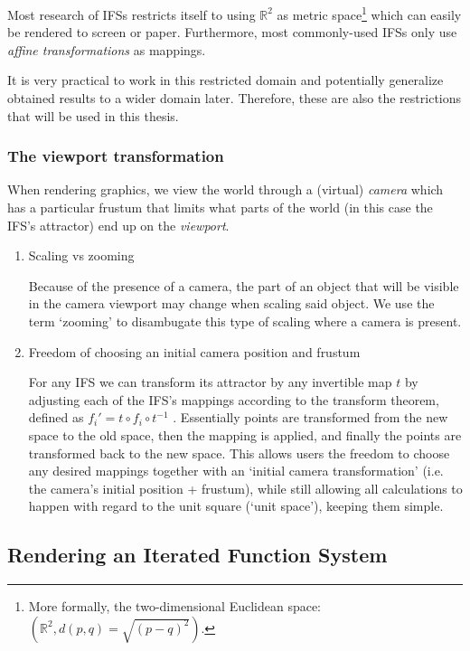 \documentclass[11pt]{article}
\begin{document}
Most research of IFSs restricts itself to using \(\mathbb{R}^2\) as metric space\footnote{More formally, the two-dimensional Euclidean space: \(\left(\mathbb{R}^2, d(p, q) = \sqrt{(p - q)^2}\right)\).} which can easily be rendered to screen or paper.
Furthermore, most commonly-used IFSs only use \emph{affine transformations} as mappings.

It is very practical to work in this restricted domain 
and potentially generalize obtained results to a wider domain later.
Therefore, these are also the restrictions that will be used in this thesis.

\subsubsection{The viewport transformation}
\label{sec:org93776c4}
\label{subsection:viewport_transformation}

When rendering graphics, we view the world through a (virtual) \emph{camera} which has a particular frustum 
that limits what parts of the world (in this case the IFS's attractor) end up on the \emph{viewport}.

\begin{enumerate}
\item Scaling vs zooming
\label{sec:org70804c5}

Because of the presence of a camera, the part of an object that will be visible in the camera viewport may change when scaling said object.
We use the term `zooming' to disambugate this type of scaling where a camera is present.

\item Freedom of choosing an initial camera position and frustum
\label{sec:org816d2a2}

For any IFS we can transform its attractor by any invertible map \(t\) by adjusting each of the IFS's mappings according to the
transform theorem, defined as \(f_i' = t \circ f_i \circ t^{-1}\) \cite{barnsley1988fractals}. 
Essentially points are transformed from the new space to the old space, then the mapping is applied, and finally the points are transformed back to the new space.
This allows users the freedom to choose any desired mappings together with an `initial camera transformation' (i.e. the camera's initial position + frustum),
while still allowing all calculations to happen with regard to the unit square (`unit space'), keeping them simple.
\end{enumerate}

\subsection{Rendering an Iterated Function System}
\label{sec:orge55d88f}
\end{document}
